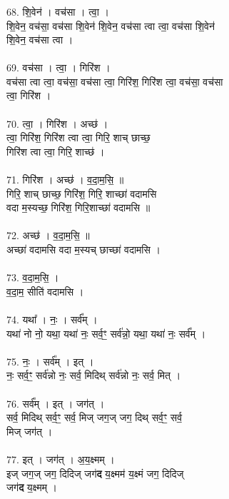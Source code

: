 \subsubsection{}
68. शि॒वेन॑ । वच॑सा । त्वा॒ ।\\
शि॒वेन॒ वच॑सा॒ वच॑सा शि॒वेन॑ शि॒वेन॒ वच॑सा त्वा त्वा॒ वच॑सा शि॒वेन॑\\
शि॒वेन॒ वच॑सा त्वा ।\\
\\
69. वच॑सा । त्वा॒ । गिरि॑श ।\\
वच॑सा त्वा त्वा॒ वच॑सा॒ वच॑सा त्वा॒ गिरि॑श॒ गिरि॑श त्वा॒ वच॑सा॒ वच॑सा\\
त्वा॒ गिरि॑श ।\\
\\
70. त्वा॒ । गिरि॑श । अच्छ॑ ।\\
त्वा॒ गिरि॑श॒ गिरि॑श त्वा त्वा॒ गिरि॒ शाच् छाच्छ॒\\
गिरि॑श त्वा त्वा॒ गिरि॒ शाच्छ॑ ।\\
\\
71. गिरि॑श । अच्छ॑ । व॒दा॒म॒सि॒ ॥\\
गिरि॒ शाच् छाच्छ॒ गिरि॑श॒ गिरि॒ शाच्छा॑ वदामसि\\
वदा म॒स्यच्छ॒ गिरि॑श॒ गिरि॒शाच्छा॑ वदामसि ॥\\
\\
72. अच्छ॑ । व॒दा॒म॒सि॒ ॥\\
अच्छा॑ वदामसि वदा म॒स्यच् छाच्छा॑ वदामसि ।\\
\\
73. व॒दा॒म॒सि॒ ।\\
व॒दा॒म॒ सीति॑ वदामसि ।\\
\\
74. यथा᳚ । नः॒ । सर्व᳚म् ।\\
यथा॑ नो नो॒ यथा॒ यथा॑ नः॒ सर्व॒ꣳ॒ सर्व॑न्नो॒ यथा॒ यथा॑ नः॒ सर्व᳚म् ।\\
\\
75. नः॒ । सर्व᳚म् । इत् ।\\
नः॒ सर्व॒ꣳ॒ सर्व॑न्नो नः॒ सर्व॒ मिदिथ् सर्व॑न्नो नः॒ सर्व॒ मित् ।\\
\\
76. सर्व᳚म् । इत् । जग॑त् ।\\
सर्व॒ मिदिथ् सर्व॒ꣳ॒ सर्व॒ मिज् जग॒ज् जग॒ दिथ् सर्व॒ꣳ॒ सर्व॒\\
मिज् जग॑त् ।\\
\\
77. इत् । जग॑त् । अ॒य॒क्ष्मम् ।\\
इज् जग॒ज् जग॒ दिदिज् जग॑\textbf{द} य॒क्ष्मम॑ य॒क्ष्मं जग॒ दिदिज्\\
जग॑\textbf{द} य॒क्ष्मम् ।\\

